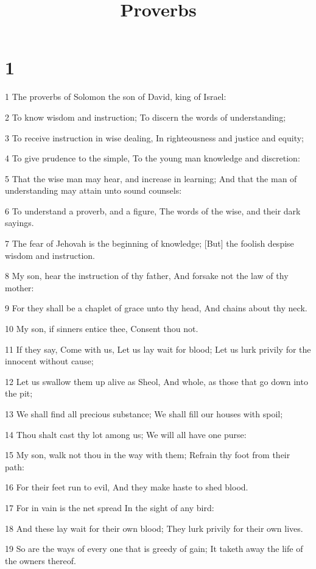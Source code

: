 

\title{Proverbs}

\chapter{1}

\par 1 The proverbs of Solomon the son of David, king of Israel:
\par 2 To know wisdom and instruction; To discern the words of understanding;
\par 3 To receive instruction in wise dealing, In righteousness and justice and equity;
\par 4 To give prudence to the simple, To the young man knowledge and discretion:
\par 5 That the wise man may hear, and increase in learning; And that the man of understanding may attain unto sound counsels:
\par 6 To understand a proverb, and a figure, The words of the wise, and their dark sayings.
\par 7 The fear of Jehovah is the beginning of knowledge; [But] the foolish despise wisdom and instruction.
\par 8 My son, hear the instruction of thy father, And forsake not the law of thy mother:
\par 9 For they shall be a chaplet of grace unto thy head, And chains about thy neck.
\par 10 My son, if sinners entice thee, Consent thou not.
\par 11 If they say, Come with us, Let us lay wait for blood; Let us lurk privily for the innocent without cause;
\par 12 Let us swallow them up alive as Sheol, And whole, as those that go down into the pit;
\par 13 We shall find all precious substance; We shall fill our houses with spoil;
\par 14 Thou shalt cast thy lot among us; We will all have one purse:
\par 15 My son, walk not thou in the way with them; Refrain thy foot from their path:
\par 16 For their feet run to evil, And they make haste to shed blood.
\par 17 For in vain is the net spread In the sight of any bird:
\par 18 And these lay wait for their own blood; They lurk privily for their own lives.
\par 19 So are the ways of every one that is greedy of gain; It taketh away the life of the owners thereof.
